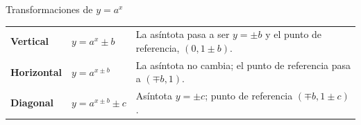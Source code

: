 \documentclass[11pt,a4paper]{article}
\begin{document}
\begin{fmprop}{Transformaciones de $y=a^x$}
\begin{center}\renewcommand{\arraystretch}{1.5}\small\begin{tabularx}{\linewidth}{>{\raggedright\arraybackslash}p{3.2cm}>{\raggedright\arraybackslash}X>{\raggedright\arraybackslash}X}\toprule
\textbf{Vertical} & $y=a^x\pm b$ & La asíntota pasa a ser $y=\pm b$ y el punto de referencia, $(0,1\pm b)$.\\[3pt]
\textbf{Horizontal} & $y=a^{x\pm b}$ & La asíntota no cambia; el punto de referencia pasa a $(\mp b,1)$.\\[3pt]
\textbf{Diagonal} & $y=a^{x\pm b}\pm c$ & Asíntota $y=\pm c$; punto de referencia $(\mp b,1\pm c)$.\\[3pt]
\bottomrule\end{tabularx}\end{center}


\end{fmprop}
\end{document}
